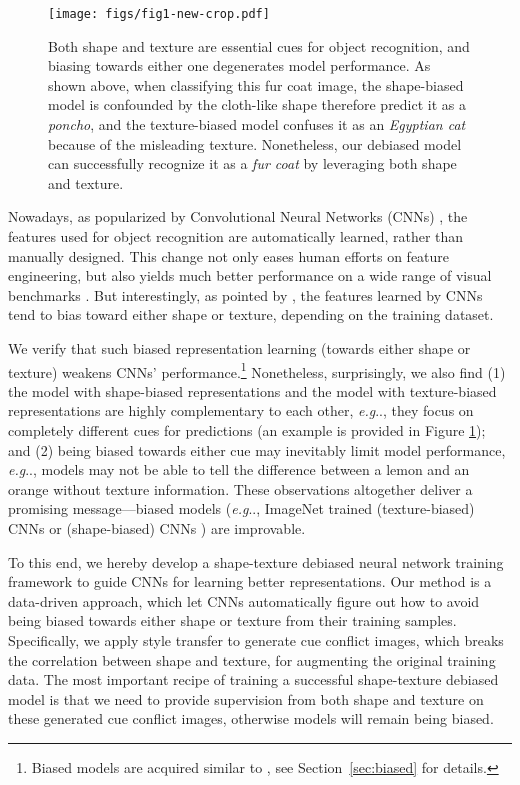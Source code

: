 \documentclass{article} \usepackage{iclr2021_conference,times}
\makeatletter
\DeclareRobustCommand\onedot{\futurelet\@let@token\@onedot}
\def\@onedot{\ifx\@let@token.\else.\null\fi\xspace}
\def\eg{\emph{e.g}\onedot} \def\Eg{\emph{E.g}\onedot}
\makeatother
\begin{document}
\begin{figure}[ht]
    \centering
    \texttt{[image: figs/fig1-new-crop.pdf]}
    \vspace{-2em}
    \caption{Both shape and texture are essential cues for object recognition, and biasing towards either one degenerates model performance.
    As shown above, when classifying this fur coat image, the shape-biased model is confounded by the cloth-like shape therefore predict it as a \emph{poncho}, and the texture-biased model confuses it as an \emph{Egyptian cat} because of the misleading texture. Nonetheless, our debiased model can successfully recognize it as a \emph{fur coat} by leveraging both shape and texture.
    }
    \label{fig:pred_comp1}
    \vspace{-1em}
\end{figure}

Nowadays, as popularized by Convolutional Neural Networks (CNNs) \citep{Krizhevsky2012}, the features used for object recognition are automatically learned, rather than manually designed. This change not only eases human efforts on feature engineering, but also yields much better performance on a wide range of visual benchmarks \citep{simonyan2014very,he2016deep,Girshick2014,Girshick2015,Ren2015,Long2015,Chen2014}. But interestingly, as pointed by \citet{geirhos2018imagenettrained}, the features learned by CNNs tend to bias toward either shape or texture, depending on the training dataset. 

We verify that such biased representation learning (towards either shape or texture) weakens CNNs' performance.\footnote{Biased models are acquired similar to \citet{geirhos2018imagenettrained}, see Section~\ref{sec:biased} for details.} Nonetheless, surprisingly, we also find (1) the model with shape-biased representations and the model with texture-biased representations are highly complementary to each other, \eg, they focus on completely different cues for predictions (an example is provided in Figure \ref{fig:pred_comp1}); and (2) being biased towards either cue may inevitably limit model performance, \eg, models may not be able to tell the difference between a lemon and an orange without texture information. These observations altogether deliver a promising message---biased models (\eg, ImageNet trained (texture-biased) CNNs \citep{geirhos2018imagenettrained} or (shape-biased) CNNs \citep{shi2020informative}) are improvable.

To this end, we hereby develop a shape-texture debiased neural network training framework to guide CNNs for learning better representations. Our method is a data-driven approach, which let CNNs automatically figure out how to avoid being biased towards either shape or texture from their training samples. Specifically, we apply style transfer to generate cue conflict images, which breaks the correlation between shape and texture, for augmenting the original training data.
The most important recipe of training a successful shape-texture debiased model is that we need to provide supervision from both shape and texture on these generated cue conflict images, otherwise models will remain being biased.
\end{document}
